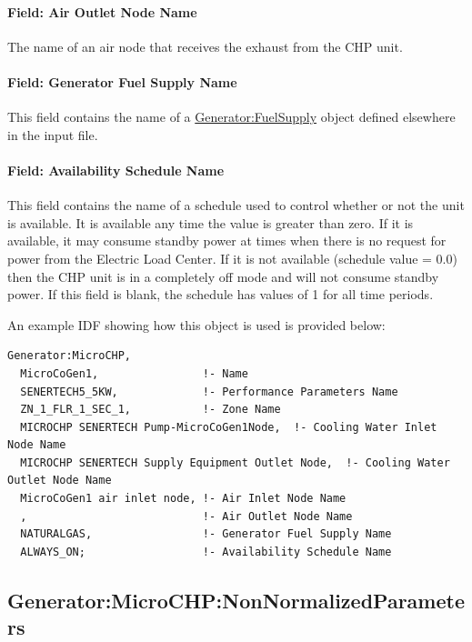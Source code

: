 \paragraph{Field: Air Outlet Node Name}\label{field-air-outlet-node-name-000}

The name of an air node that receives the exhaust from the CHP unit.

\paragraph{Field: Generator Fuel Supply Name}\label{field-generator-fuel-supply-name}

This field contains the name of a \hyperref[generatorfuelsupply]{Generator:FuelSupply} object defined elsewhere in the input file.

\paragraph{Field: Availability Schedule Name}\label{field-availability-schedule-name-7-000}

This field contains the name of a schedule used to control whether or not the unit is available. It is available any time the value is greater than zero. If it is available, it may consume standby power at times when there is no request for power from the Electric Load Center. If it is not available (schedule value = 0.0) then the CHP unit is in a completely off mode and will not consume standby power. If this field is blank, the schedule has values of 1 for all time periods.

An example IDF showing how this object is used is provided below:

\begin{lstlisting}
Generator:MicroCHP,
  MicroCoGen1,                !- Name
  SENERTECH5_5KW,             !- Performance Parameters Name
  ZN_1_FLR_1_SEC_1,           !- Zone Name
  MICROCHP SENERTECH Pump-MicroCoGen1Node,  !- Cooling Water Inlet Node Name
  MICROCHP SENERTECH Supply Equipment Outlet Node,  !- Cooling Water Outlet Node Name
  MicroCoGen1 air inlet node, !- Air Inlet Node Name
  ,                           !- Air Outlet Node Name
  NATURALGAS,                 !- Generator Fuel Supply Name
  ALWAYS_ON;                  !- Availability Schedule Name
\end{lstlisting}

\subsection{Generator:MicroCHP:NonNormalizedParameters}\label{generatormicrochpnonnormalizedparameters}


